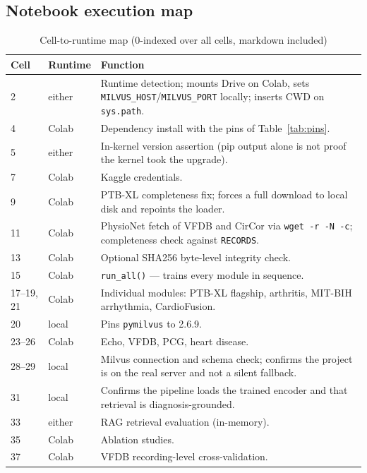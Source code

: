 \documentclass[11pt,a4paper]{article}
\newcommand{\code}[1]{\texttt{\small #1}}
\begin{document}
\subsection{Notebook execution map}

\begin{table}[!ht]
\centering
\caption{Cell-to-runtime map (0-indexed over all cells, markdown included)}
\label{tab:cells}
\small
\begin{tabular}{@{}p{1.6cm}p{2.4cm}p{10.6cm}@{}}
\toprule
\textbf{Cell} & \textbf{Runtime} & \textbf{Function}\\
\midrule
2  & either & Runtime detection; mounts Drive on Colab, sets
\code{MILVUS\_HOST}/\code{MILVUS\_PORT} locally; inserts CWD on
\code{sys.path}.\\
4  & Colab & Dependency install with the pins of Table~\ref{tab:pins}.\\
5  & either & In-kernel version assertion (pip output alone is not proof
the kernel took the upgrade).\\
7  & Colab & Kaggle credentials.\\
9  & Colab & PTB-XL completeness fix; forces a full download to local disk
and repoints the loader.\\
11 & Colab & PhysioNet fetch of VFDB and CirCor via
\code{wget -r -N -c}; completeness check against \code{RECORDS}.\\
13 & Colab & Optional SHA256 byte-level integrity check.\\
15 & Colab & \code{run\_all()} --- trains every module in sequence.\\
17--19, 21 & Colab & Individual modules: PTB-XL flagship, arthritis,
MIT-BIH arrhythmia, CardioFusion.\\
20 & local & Pins \code{pymilvus} to 2.6.9.\\
23--26 & Colab & Echo, VFDB, PCG, heart disease.\\
28--29 & local & Milvus connection and schema check; confirms the project
is on the real server and not a silent fallback.\\
31 & local & Confirms the pipeline loads the trained encoder and that
retrieval is diagnosis-grounded.\\
33 & either & RAG retrieval evaluation (in-memory).\\
35 & Colab & Ablation studies.\\
37 & Colab & VFDB recording-level cross-validation.\\
\bottomrule
\end{tabular}
\end{table}
\end{document}
